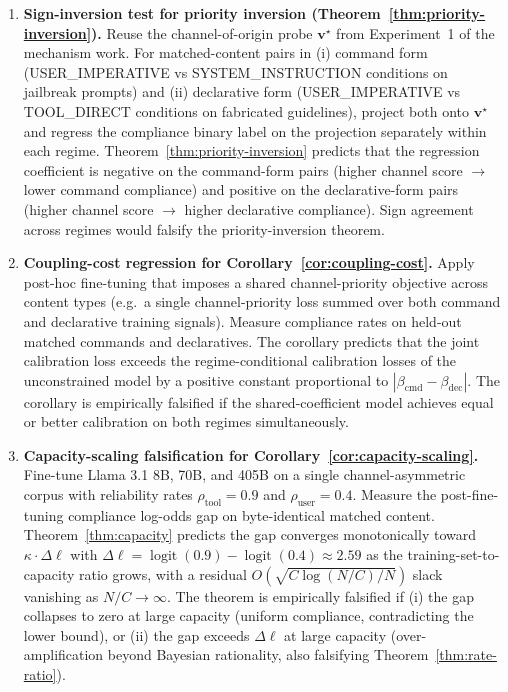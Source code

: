 \documentclass[11pt]{article}
\theoremstyle{definition}
\theoremstyle{remark}
\begin{document}
\begin{enumerate}
\item \textbf{Sign-inversion test for priority inversion (Theorem~\ref{thm:priority-inversion}).}
Reuse the channel-of-origin probe $\mathbf{v}^\star$ from Experiment~1 of the
mechanism work. For matched-content pairs in (i) command form (USER\_IMPERATIVE
vs SYSTEM\_INSTRUCTION conditions on jailbreak prompts) and (ii) declarative
form (USER\_IMPERATIVE vs TOOL\_DIRECT conditions on fabricated guidelines),
project both onto $\mathbf{v}^\star$ and regress the compliance binary label on
the projection separately within each regime. Theorem~\ref{thm:priority-inversion}
predicts that the regression coefficient is negative on the command-form pairs
(higher channel score $\to$ lower command compliance) and positive on the
declarative-form pairs (higher channel score $\to$ higher declarative compliance).
Sign agreement across regimes would falsify the priority-inversion theorem.

\item \textbf{Coupling-cost regression for Corollary~\ref{cor:coupling-cost}.}
Apply post-hoc fine-tuning that imposes a shared channel-priority objective
across content types (e.g.\ a single channel-priority loss summed over both
command and declarative training signals). Measure compliance rates on held-out
matched commands and declaratives. The corollary predicts that the joint
calibration loss exceeds the regime-conditional calibration losses of the
unconstrained model by a positive constant proportional to
$|\beta_{\text{cmd}} - \beta_{\text{dec}}|$. The corollary is empirically falsified
if the shared-coefficient model achieves equal or better calibration on both
regimes simultaneously.

\item \textbf{Capacity-scaling falsification for Corollary~\ref{cor:capacity-scaling}.}
Fine-tune Llama 3.1 8B, 70B, and 405B on a single channel-asymmetric corpus
with reliability rates $\rho_{\text{tool}} = 0.9$ and $\rho_{\text{user}} = 0.4$.
Measure the post-fine-tuning compliance log-odds gap on byte-identical matched
content. Theorem~\ref{thm:capacity} predicts the gap converges monotonically
toward $\kappa \cdot \Delta\ell$ with $\Delta\ell = \operatorname{logit}(0.9) - \operatorname{logit}(0.4) \approx 2.59$
as the training-set-to-capacity ratio grows, with a residual $O(\sqrt{C \log(N/C)/N})$ slack vanishing as $N/C \to \infty$.
The theorem is empirically falsified if (i) the gap collapses to zero at large
capacity (uniform compliance, contradicting the lower bound), or (ii) the gap
exceeds $\Delta\ell$ at large capacity (over-amplification beyond Bayesian
rationality, also falsifying Theorem~\ref{thm:rate-ratio}).
\end{enumerate}
\end{document}

